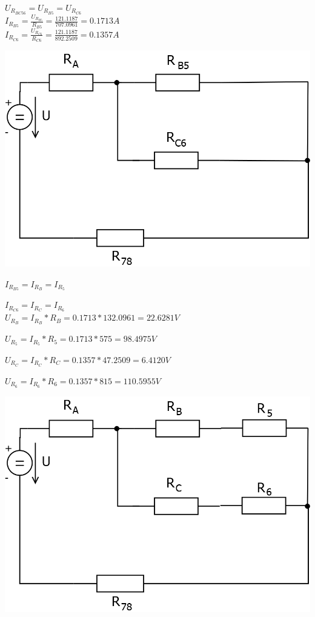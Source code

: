 \documentclass{article}
\begin{document}
\begin{large}
    $U_{R_{BC56}}=U_{R_{B5}}=U_{R_{C6}}$\\
    
    $I_{R_{B5}}=\frac{U_{R_{B5}}}{R_{B5}}=\frac{121.1187}{707.0961}=0.1713A$\\
    
    $I_{R_{C6}}=\frac{U_{R_{C6}}}{R_{C6}}=\frac{121.1187}{892.2509}=0.1357A$\\


\begin{center}
    \includegraphics[scale=0.3]{Pr1/Pr1_4.png}
\end{center}


    $I_{R_{B5}}=I_{R_{B}}=I_{R_{5}}$
    
    $I_{R_{C6}}=I_{R_{C}}=I_{R_{6}}$\\
    
    $U_{R_{B}}=I_{R_{B}}*R_{B}=0.1713*132.0961=22.6281V$
    
    $U_{R_{5}}=I_{R_{5}}*R_{5}=0.1713*575=98.4975V$
    
    $U_{R_{C}}=I_{R_{C}}*R_{C}=0.1357*47.2509=6.4120V$
    
    $U_{R_{6}}=I_{R_{6}}*R_{6}=0.1357*815=110.5955V$


\begin{center}
    \includegraphics[scale=0.3]{Pr1/Pr1_3.png}
\end{center}



\end{large}
\end{document}
